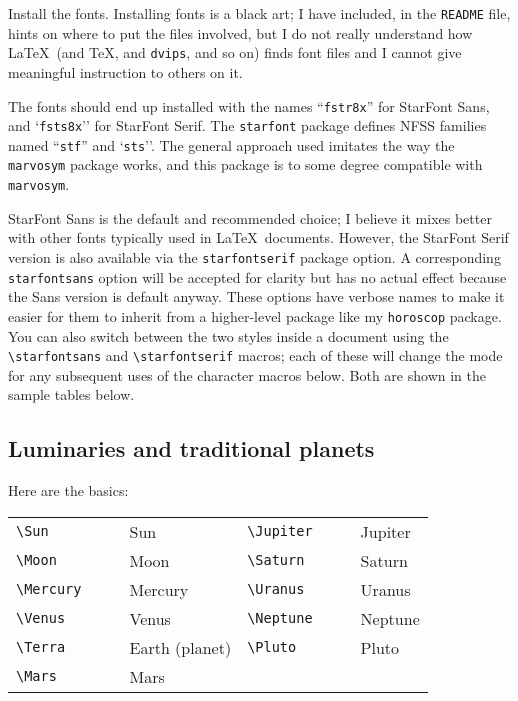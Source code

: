\documentclass{article}
\newcommand{\showboth}[1]{\starfontsans #1 & \starfontserif #1}
\begin{document}
Install the fonts.  Installing fonts is a black art; I have included, in the
\texttt{README} file, hints on where to put the files involved, but I do not
really understand how \LaTeX\ (and \TeX, and \texttt{dvips}, and so on)
finds font files and I cannot give meaningful instruction to others on it.

The fonts should end up installed with the names ``\texttt{fstr8x}'' for
StarFont Sans, and `\texttt{fsts8x}'' for StarFont Serif.  The
\texttt{starfont} package defines NFSS families named ``\texttt{stf}'' and
`\texttt{sts}''. The general approach used imitates the way the
\texttt{marvosym} package works, and this package is to some degree
compatible with \texttt{marvosym}.

StarFont Sans is the default and recommended choice; I believe it mixes
better with other fonts typically used in \LaTeX\ documents. However, the
StarFont Serif version is also available via the \texttt{starfontserif}
package option.  A corresponding \texttt{starfontsans} option will be
accepted for clarity but has no actual effect because the Sans version is
default anyway.  These options have verbose names to make it easier for them
to inherit from a higher-level package like my \texttt{horoscop} package. 
You can also switch between the two styles inside a document using the
\verb|\starfontsans| and \verb|\starfontserif| macros; each of these will
change the mode for any subsequent uses of the character macros below.  Both
are shown in the sample tables below.

\subsection{Luminaries and traditional planets}

Here are the basics:

\begin{tabular}{llll|llll}
\verb|\Sun| & \showboth{\Sun} & Sun &
   \verb|\Jupiter| & \showboth{\Jupiter} & Jupiter \\
\verb|\Moon| & \showboth{\Moon} & Moon &
   \verb|\Saturn| & \showboth{\Saturn} & Saturn \\
\verb|\Mercury| & \showboth{\Mercury} & Mercury &
   \verb|\Uranus| & \showboth{\Uranus} & Uranus \\
\verb|\Venus| & \showboth{\Venus} & Venus &
   \verb|\Neptune| & \showboth{\Neptune} & Neptune \\
\verb|\Terra| & \showboth{\Terra} & Earth (planet) &
   \verb|\Pluto| & \showboth{\Pluto} & Pluto \\
\verb|\Mars| & \showboth{\Mars} & Mars
\end{tabular}
\end{document}
